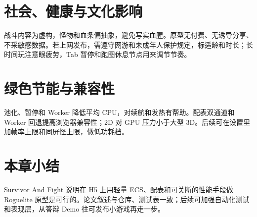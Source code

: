 \section{社会、健康与文化影响}

战斗内容为虚构，怪物和血条偏抽象，避免写实血腥。原型无付费、无诱导分享、不采敏感数据。若上网发布，需遵守网游和未成年人保护规定，标适龄和时长；长时间玩注意眼疲劳，Tab 暂停和跑图休息节点用来调节节奏\cite{petty2010vv}。

\section{绿色节能与兼容性}

池化、暂停和 Worker 降低平均 CPU，对续航和发热有帮助\cite{gregory2018game}。配表双通道和 Worker 回退提高浏览器兼容性；2D 对 GPU 压力小于大型 3D。后续可在设置里加帧率上限和同屏怪上限，做低功耗档。

\section{本章小结}

Survivor And Fight 说明在 H5 上用轻量 ECS、配表和可关断的性能手段做 Roguelite 原型是可行的。论文叙述与仓库、测试表一致；后续可加强自动化测试和表现层，从答辩 Demo 往可发布小游戏再走一步。
